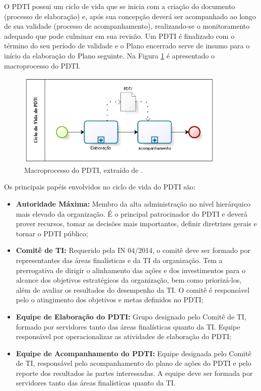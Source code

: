 O PDTI possui um ciclo de vida que se inicia com a criação do documento (processo de elaboração) e, após sua concepção deverá ser acompanhado ao longo de sua validade (processo de acompanhamento), realizando-se o monitoramento adequado que pode culminar em sua revisão. Um PDTI é finalizado com o término do seu período de validade e o Plano encerrado serve de insumo para o início da elaboração do Plano seguinte. Na Figura \ref{figura:pdti01Macroprocesso} é apresentado o macroprocesso do PDTI.

\begin{figure}[h!]
\centering %
\includegraphics[width=10cm]{figuras/pdti01Macroprocesso.png}
\caption{Macroprocesso do PDTI, extraído de \cite{sisp:15}.}
\label{figura:pdti01Macroprocesso}
\end{figure}

Os principais papéis envolvidos no ciclo de vida do PDTI são:
\begin{itemize}
\item \textbf{Autoridade Máxima:} Membro da alta administração no nível hierárquico mais elevado da organização. É o principal patrocinador do PDTI e deverá prover recursos, tomar as decisões mais importantes, definir diretrizes gerais e tornar o PDTI público;
\item \textbf{Comitê de TI:} Requerido pela IN 04/2014, o comitê deve ser formado por representantes das áreas finalísticas e da TI da organização. Tem a prerrogativa de dirigir o alinhamento das ações e dos investimentos para o alcance dos objetivos estratégicos da organização, bem como priorizá-los, além de avaliar os resultados do desempenho da TI. O comitê é responsável pelo o atingimento dos objetivos e metas definidos no PDTI;
\item \textbf{Equipe de Elaboração do PDTI:} Grupo designado pelo Comitê de TI, formado por servidores tanto das áreas finalísticas quanto da TI. Equipe responsável por operacionalizar as atividades de elaboração do PDTI;
\item \textbf{Equipe de Acompanhamento do PDTI:} Equipe designada pelo Comitê de TI, responsável pelo acompanhamento do plano de ações do PDTI e pelo reporte dos resultados às partes interessadas. A equipe deve ser formada por servidores tanto das áreas finalísticas quanto da TI.
\end{itemize}

